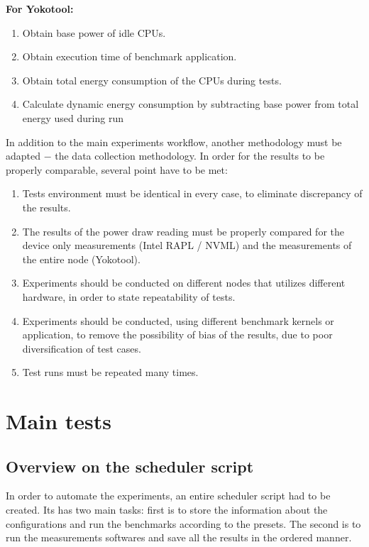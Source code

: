 \textbf{For Yokotool:}
\begin{enumerate}
    \item Obtain base power of idle CPUs.
    \item Obtain execution time of benchmark application.
    \item Obtain total energy consumption of the CPUs during tests.
    \item Calculate dynamic energy consumption by subtracting base power from
    total energy used during run
\end{enumerate}

\newpage

In addition to the main experiments workflow, another methodology must be
adapted $-$ the data collection methodology. In order for the results to be
properly comparable, several point have to be met:
\begin{enumerate}
    \item Tests environment must be identical in every case, to eliminate
    discrepancy of the results.
    \item The results of the power draw reading must be properly compared for
    the device only measurements (Intel RAPL / NVML) and the measurements of
    the entire node (Yokotool).
    \item Experiments should be conducted on different nodes that utilizes
    different hardware, in order to state repeatability of tests.
    \item Experiments should be conducted, using different benchmark kernels
    or application, to remove the possibility of bias of the results, due to
    poor diversification of test cases.
    \item Test runs must be repeated many times.
\end{enumerate}

\section{Main tests}

\subsection{Overview on the scheduler script}

In order to automate the experiments, an entire scheduler script had to be
created. Its has two main tasks: first is to store the information about the
configurations and run the benchmarks according to the presets. The second
is to run the measurements softwares and save all the results in the ordered
manner.

